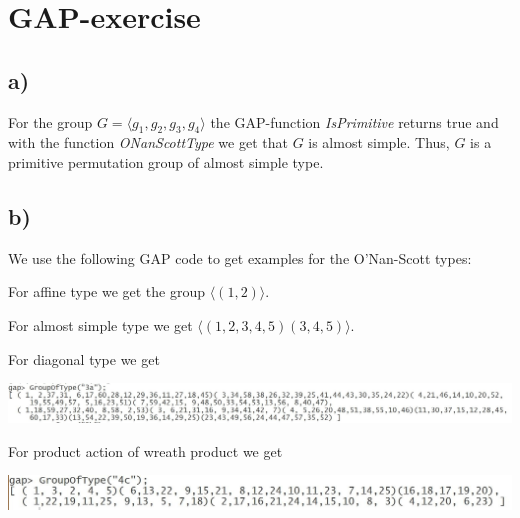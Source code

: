\section{GAP-exercise}
\subsection*{a)}
For the group $G = \langle g_1,g_2,g_3,g_4 \rangle$ the GAP-function \textit{IsPrimitive} returns true and with the function \textit{ONanScottType} we get that $G$ is almost simple. Thus, $G$ is a primitive permutation group of almost simple type.

\subsection*{b)}
We use the following GAP code to get examples for the O'Nan-Scott types:



For affine type we get the group $\langle (1,2) \rangle$. 

For almost simple type we get $\langle (1,2,3,4,5) (3,4,5) \rangle$.

For diagonal type we get 

\hspace*{-1cm}
\includegraphics[width=17cm]{ex4_3}

For product action of wreath product we get

\hspace*{-1cm}
\includegraphics[width=17cm]{ex4_4}